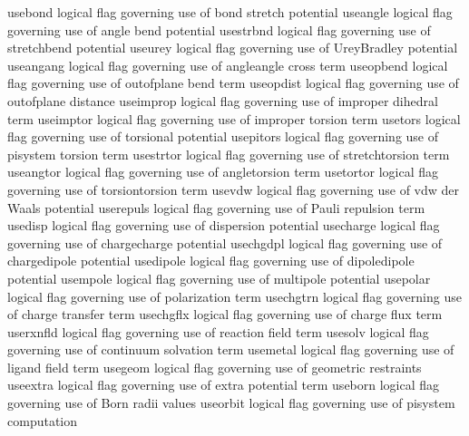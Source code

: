 \documentclass[letterpaper,11pt,english]{sphinxmanual}
\begin{document}

\begin{sphinxVerbatim}[commandchars=\\\{\}]
use\PYGZus{}bond        logical flag governing use of bond stretch potential
use\PYGZus{}angle       logical flag governing use of angle bend potential
use\PYGZus{}strbnd      logical flag governing use of stretch\PYGZhy{}bend potential
use\PYGZus{}urey        logical flag governing use of Urey\PYGZhy{}Bradley potential
use\PYGZus{}angang      logical flag governing use of angle\PYGZhy{}angle cross term
use\PYGZus{}opbend      logical flag governing use of out\PYGZhy{}of\PYGZhy{}plane bend term
use\PYGZus{}opdist      logical flag governing use of out\PYGZhy{}of\PYGZhy{}plane distance
use\PYGZus{}improp      logical flag governing use of improper dihedral term
use\PYGZus{}imptor      logical flag governing use of improper torsion term
use\PYGZus{}tors        logical flag governing use of torsional potential
use\PYGZus{}pitors      logical flag governing use of pi\PYGZhy{}system torsion term
use\PYGZus{}strtor      logical flag governing use of stretch\PYGZhy{}torsion term
use\PYGZus{}angtor      logical flag governing use of angle\PYGZhy{}torsion term
use\PYGZus{}tortor      logical flag governing use of torsion\PYGZhy{}torsion term
use\PYGZus{}vdw         logical flag governing use of vdw der Waals potential
use\PYGZus{}repuls      logical flag governing use of Pauli repulsion term
use\PYGZus{}disp        logical flag governing use of dispersion potential
use\PYGZus{}charge      logical flag governing use of charge\PYGZhy{}charge potential
use\PYGZus{}chgdpl      logical flag governing use of charge\PYGZhy{}dipole potential
use\PYGZus{}dipole      logical flag governing use of dipole\PYGZhy{}dipole potential
use\PYGZus{}mpole       logical flag governing use of multipole potential
use\PYGZus{}polar       logical flag governing use of polarization term
use\PYGZus{}chgtrn      logical flag governing use of charge transfer term
use\PYGZus{}chgflx      logical flag governing use of charge flux term
use\PYGZus{}rxnfld      logical flag governing use of reaction field term
use\PYGZus{}solv        logical flag governing use of continuum solvation term
use\PYGZus{}metal       logical flag governing use of ligand field term
use\PYGZus{}geom        logical flag governing use of geometric restraints
use\PYGZus{}extra       logical flag governing use of extra potential term
use\PYGZus{}born        logical flag governing use of Born radii values
use\PYGZus{}orbit       logical flag governing use of pisystem computation
\end{sphinxVerbatim}
\end{document}

